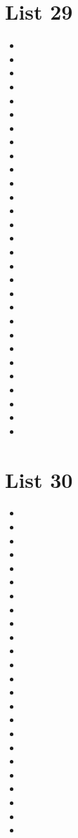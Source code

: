 \documentclass[a4paper,10pt]{article}
\begin{document}
\begin{CJK*}{UTF8}{gkai}
\newpage
\section{List 29}
\begin{itemize}
\item 
\item 
\item 
\item 
\item 
\item 
\item 
\item 
\item 
\item 
\item 
\item 
\item 
\item 
\item 
\item 
\item 
\item 
\item 
\item 
\item 
\item 
\item 
\item 
\item 
\item 
\item 
\item 
\item 
\end{itemize}

\newpage
\section{List 30}
\begin{itemize}
\item 
\item 
\item 
\item 
\item 
\item 
\item 
\item 
\item 
\item 
\item 
\item 
\item 
\item 
\item 
\item 
\item 
\item 
\item 
\item 
\item 
\item 
\item 
\item 
\end{itemize}


\end{CJK*}
\end{document}
